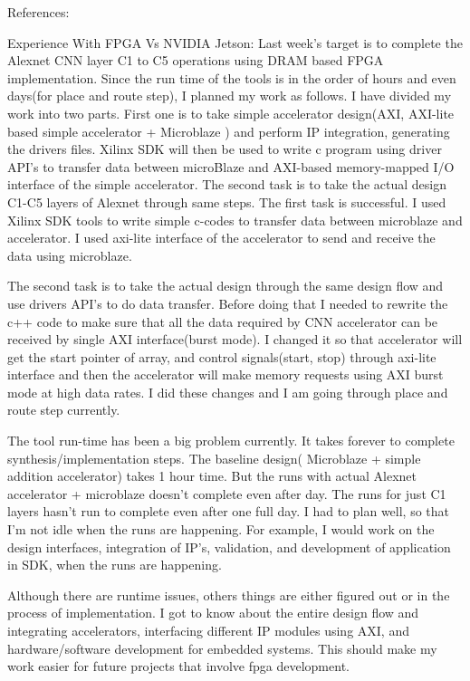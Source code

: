 References:


Experience With FPGA Vs NVIDIA Jetson: \newline
Last week’s target is to complete the Alexnet CNN layer C1 to C5 operations using DRAM based FPGA implementation. Since the run time of the tools is in the order of hours and even days(for place and route step), I planned my work as follows. I have divided my work into two parts. First one is to take simple accelerator design(AXI, AXI-lite based simple accelerator + Microblaze ) and perform  IP integration, generating the drivers files. Xilinx SDK will then be used to write c program using driver API’s to transfer data between microBlaze and AXI-based memory-mapped I/O interface of the simple accelerator.  The second task is to take the actual design C1-C5 layers of Alexnet through same steps. The first task is successful. I used Xilinx SDK tools to write simple c-codes to transfer data between microblaze and accelerator. I used axi-lite interface of the accelerator to send and receive the data using microblaze. 

The second task is to take the actual design through the same design flow and use drivers API’s to do data transfer. Before doing that I needed to rewrite the c++ code to make sure that all the data required by CNN accelerator can be received by single AXI interface(burst mode). I changed it so that accelerator will get the start pointer of array, and control signals(start, stop)  through axi-lite interface and then the accelerator will make memory requests using AXI burst mode at high data rates. I did these changes and I am going through place and route step currently. 

The tool run-time has been a big problem currently. It takes forever to complete synthesis/implementation steps. The baseline design( Microblaze + simple addition accelerator) takes 1 hour time. But the runs with actual Alexnet accelerator + microblaze doesn’t complete even after day. The runs for just C1 layers hasn’t run to complete even after one full day. I had to plan well, so that I’m not idle when the runs are happening. For example, I would work on the design interfaces, integration of IP’s, validation, and development of application in SDK, when the runs are happening.

Although there are runtime issues, others things are either figured out or in the process of implementation.  I got to know about the entire design flow and integrating accelerators, interfacing different IP modules using AXI, and hardware/software development for embedded systems. This should make my work easier for future projects that involve fpga development. 




